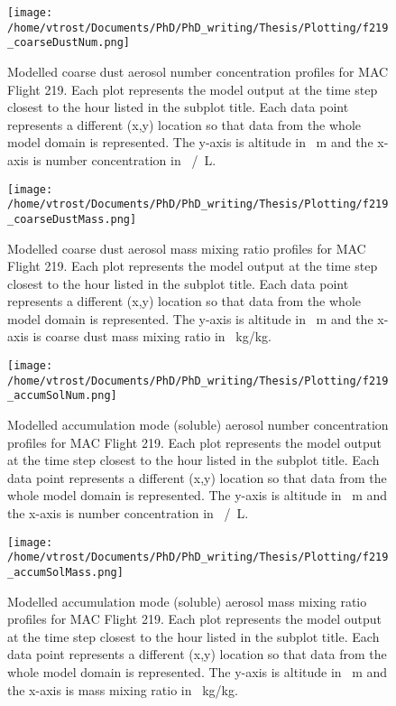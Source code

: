 \begin{figure}[H]
	\centering
	\texttt{[image: /home/vtrost/Documents/PhD/PhD\_writing/Thesis/Plotting/f219\_coarseDustNum.png]}
	\caption{Modelled coarse dust aerosol number concentration profiles for MAC Flight 219. Each plot represents the model output at the time step closest to the hour listed in the subplot title. Each data point represents a different (x,y) location so that data from the whole model domain is represented. The y-axis is altitude in \SI{}{m} and the x-axis is number concentration in \SI{}{/L}.}
\end{figure}

\begin{figure}[H]
	\centering
	\texttt{[image: /home/vtrost/Documents/PhD/PhD\_writing/Thesis/Plotting/f219\_coarseDustMass.png]}
	\caption{Modelled coarse dust aerosol mass mixing ratio profiles for MAC Flight 219. Each plot represents the model output at the time step closest to the hour listed in the subplot title. Each data point represents a different (x,y) location so that data from the whole model domain is represented. The y-axis is altitude in \SI{}{m} and the x-axis is coarse dust mass mixing ratio in \SI{}{kg/kg}.}
\end{figure}

\begin{figure}[H]
	\centering
	\texttt{[image: /home/vtrost/Documents/PhD/PhD\_writing/Thesis/Plotting/f219\_accumSolNum.png]}
	\caption{Modelled accumulation mode (soluble) aerosol number concentration profiles for MAC Flight 219. Each plot represents the model output at the time step closest to the hour listed in the subplot title. Each data point represents a different (x,y) location so that data from the whole model domain is represented. The y-axis is altitude in \SI{}{m} and the x-axis is number concentration in \SI{}{/L}.}
\end{figure}

\begin{figure}[H]
	\centering
	\texttt{[image: /home/vtrost/Documents/PhD/PhD\_writing/Thesis/Plotting/f219\_accumSolMass.png]}
	\caption{Modelled accumulation mode (soluble) aerosol mass mixing ratio profiles for MAC Flight 219. Each plot represents the model output at the time step closest to the hour listed in the subplot title. Each data point represents a different (x,y) location so that data from the whole model domain is represented. The y-axis is altitude in \SI{}{m} and the x-axis is mass mixing ratio in \SI{}{kg/kg}.}
\end{figure}

